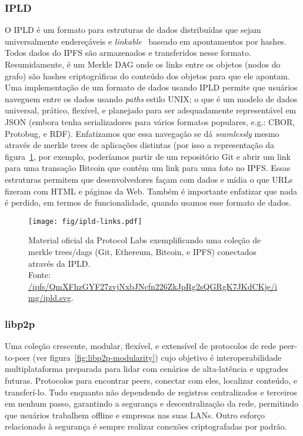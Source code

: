 \subsubsection{\label{subsubsec:ipld}IPLD}

O IPLD é um formato para estruturas de dados distribuídas que sejam universalmente endereçáveis e \textit{linkable}~\cite{github:ipld} baseado em apontamentos por hashes.
Todos dados do IPFS são armazenados e transferidos nesse formato.
Resumidamente, é um Merkle DAG onde os links entre os objetos (nodos do grafo) são hashes criptográficas do conteúdo dos objetos para que ele apontam.
Uma implementação de um formato de dados usando IPLD permite que usuários naveguem entre os dados usando \textit{paths} estilo UNIX; o que é um modelo de dados universal, prático, flexível, e planejado para ser adequadamente representável em JSON (embora tenha serializadores para vários formatos populares, e.g.: CBOR, Protobug, e RDF).
Enfatizamos que essa navegação se dá \textit{seamlessly} mesmo através de merkle trees de aplicações distintas (por isso a representação da figura~\ref{fig:ipld-links}, por exemplo, poderíamos partir de um repositório Git e abrir um link para uma transação Bitcoin que contém um link para uma foto no IPFS.
Essas estruturas permitem que desenvolvedores façam com dados e mídia o que URLs fizeram com HTML e páginas da Web.
Também é importante enfatizar que nada é perdido, em termos de funcionalidade, quando usamos esse formato de dados.

\begin{figure}[H]
    \centering
    \texttt{[image: fig/ipld-links.pdf]}
    \caption[IPFS's IPLD merkle forest]{
        Material oficial da Protocol Labs exemplificando uma coleção de merkle trees/dags (Git, Ethereum, Bitcoin, e IPFS) conectados através da IPLD.\\
        Fonte: \url{/ipfs/QmXFhzGYF27zvjNxbJNcfn226ZkJpRg2sQGRgK7JKdCKje/img/ipld.svg}.
    }
    \label{fig:ipld-links}
\end{figure}

\subsubsection{\label{subsubsec:libp2p}libp2p}

Uma coleção crescente, modular, flexível, e extensível de protocolos de rede peer-to-peer (ver figura~\ref{fig:libp2p-modularity}) cujo objetivo é interoperabilidade multiplataforma preparada para lidar com cenários de alta-latência e upgrades futuras.
Protocolos para encontrar peers, conectar com eles, localizar conteúdo, e transferí-lo.
Tudo enquanto não dependendo de registros centralizados e terceiros em nenhum passo, garantindo a segurança e descentralização da rede, permitindo que usuários trabalhem offline e empresas nas suas LANs.
Outro esforço relacionado à segurança é sempre realizar conexões criptografadas por padrão.

